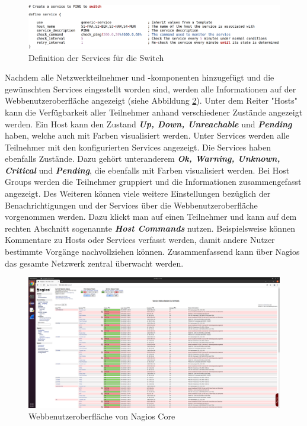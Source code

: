 \documentclass[fontsize=12pt,paper=a4,open=any,parskip=half,
  twoside=false,toc=listof,toc=bibliography,fleqn,leqno,
  captions=nooneline,captions=tableabove,british]{scrbook}
\begin{document}
\begin{figure}[H]
 \centering
 \includegraphics[width=1.0\textwidth]{Bilder/nagios-service}
 \captionsetup{justification=centering, margin=2cm}
 \caption{Definition der Services für die Switch}
 \label{nagios-service}
\end{figure}
Nachdem alle Netzwerkteilnehmer und -komponenten hinzugefügt und die gewünschten Services eingestellt worden sind, werden alle Informationen auf der Webbenutzeroberfläche angezeigt (siehe Abbildung \ref{nagios}). Unter dem Reiter "Hosts" kann die Verfügbarkeit aller Teilnehmer anhand verschiedener Zustände angezeigt werden. Ein Host kann den Zustand \textit{\textbf{Up, Down, Unreachable}} und \textit{\textbf{Pending}} haben, welche auch mit Farben visualisiert werden. Unter Services werden alle Teilnehmer mit den konfigurierten Services angezeigt. Die Services haben ebenfalls Zustände. Dazu gehört unteranderem \textit{\textbf{Ok, Warning, Unknown, Critical}} und \textit{\textbf{Pending}}, die ebenfalls mit Farben visualisiert werden. Bei Host Groups werden die Teilnehmer gruppiert und die Informationen zusammengefasst angezeigt. Des Weiteren können viele weitere Einstellungen bezüglich der Benachrichtigungen und der Services über die Webbenutzeroberfläche vorgenommen werden. Dazu klickt man auf einen Teilnehmer und kann auf dem rechten Abschnitt sogenannte \textit{\textbf{Host Commands}} nutzen. Beispielsweise können Kommentare zu Hosts oder Services verfasst werden, damit andere Nutzer bestimmte Vorgänge nachvollziehen können. Zusammenfassend kann über Nagios das gesamte Netzwerk zentral überwacht werden.


\begin{figure}[H]
 \centering
 \includegraphics[width=1.0\textwidth]{Bilder/nagios}
 \captionsetup{justification=centering, margin=2cm}
 \caption{Webbenutzeroberfläche von Nagios Core}
 \label{nagios}
\end{figure}
\end{document}
